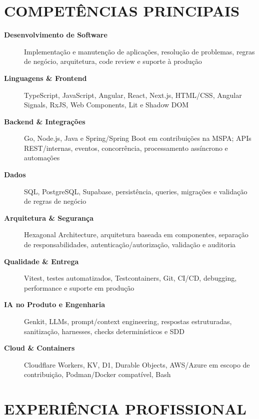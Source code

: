 \documentclass[10pt,a4paper]{article}
\begin{document}
\section*{COMPETÊNCIAS PRINCIPAIS}

\footnotesize

\begin{description}
    \item[\textbf{Desenvolvimento de Software}]
    Implementação e manutenção de aplicações, resolução de problemas, regras de negócio, arquitetura, code review e suporte à produção

    \item[\textbf{Linguagens \& Frontend}]
    TypeScript, JavaScript, Angular, React, Next.js, HTML/CSS, Angular Signals, RxJS, Web Components, Lit e Shadow DOM

    \item[\textbf{Backend \& Integrações}]
    Go, Node.js, Java e Spring/Spring Boot em contribuições na MSPA; APIs REST/internas, eventos, concorrência, processamento assíncrono e automações

    \item[\textbf{Dados}]
    SQL, PostgreSQL, Supabase, persistência, queries, migrações e validação de regras de negócio

    \item[\textbf{Arquitetura \& Segurança}]
    Hexagonal Architecture, arquitetura baseada em componentes, separação de responsabilidades, autenticação/autorização, validação e auditoria

    \item[\textbf{Qualidade \& Entrega}]
    Vitest, testes automatizados, Testcontainers, Git, CI/CD, debugging, performance e suporte em produção

    \item[\textbf{IA no Produto e Engenharia}]
    Genkit, LLMs, prompt/context engineering, respostas estruturadas, sanitização, harnesses, checks determinísticos e SDD

    \item[\textbf{Cloud \& Containers}]
    Cloudflare Workers, KV, D1, Durable Objects, AWS/Azure em escopo de contribuição, Podman/Docker compatível, Bash
\end{description}


\section*{EXPERIÊNCIA PROFISSIONAL}
\end{document}
